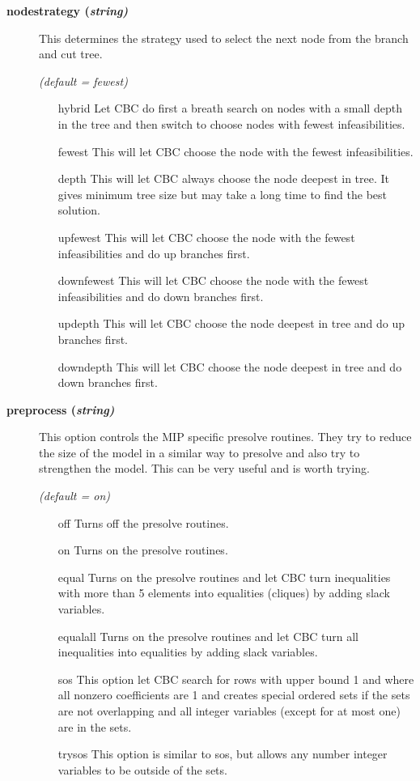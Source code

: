 \begin{description}
\item[\label{nodestrategy}\hypertarget{nodestrategy}
{\textbf{nodestrategy (\slshape{string})}}]\hspace{1.0in}

This determines the strategy used to select the next node from the branch and cut tree.

\textsl{(default = fewest)}
\begin{itemize}
\item[hybrid] 
Let CBC do first a breath search on nodes with a small depth in the tree and then switch to choose nodes with fewest infeasibilities.
\item[fewest] 
This will let CBC choose the node with the fewest infeasibilities.
\item[depth] 
This will let CBC always choose the node deepest in tree.
It gives minimum tree size but may take a long time to find the best solution.
\item[upfewest] 
This will let CBC choose the node with the fewest infeasibilities and do up branches first.
\item[downfewest] 
This will let CBC choose the node with the fewest infeasibilities and do down branches first.
\item[updepth] 
This will let CBC choose the node deepest in tree and do up branches first.
\item[downdepth] 
This will let CBC choose the node deepest in tree and do down branches first.
\end{itemize}

\item[\label{preprocess}\hypertarget{preprocess}
{\textbf{preprocess (\slshape{string})}}]\hspace{1.0in}

This option controls the MIP specific presolve routines.
They try to reduce the size of the model in a similar way to presolve and also try to strengthen the model.
This can be very useful and is worth trying.

\textsl{(default = on)}
\begin{itemize}
\item[off] 
Turns off the presolve routines.
\item[on] 
Turns on the presolve routines.
\item[equal] 
Turns on the presolve routines and let CBC turn inequalities with more than 5 elements into equalities (cliques) by adding slack variables.
\item[equalall] 
Turns on the presolve routines and let CBC turn all inequalities into equalities by adding slack variables.
\item[sos] 
This option let CBC search for rows with upper bound 1 and where all nonzero coefficients are 1 and creates special ordered sets if the sets are not overlapping and all integer variables (except for at most one) are in the sets.
\item[trysos] 
This option is similar to sos, but allows any number integer variables to be outside of the sets.
\end{itemize}


\end{description}
